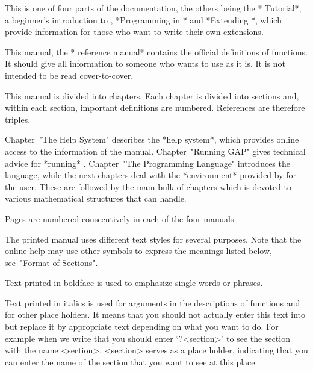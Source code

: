%
%
%
%

This is one of four parts of the {\GAP} documentation,
the others being the *{\GAP} Tutorial*, a beginner's introduction to {\GAP},
*Programming in {\GAP}* and *Extending {\GAP}*,
which provide information for those who want to write their own
{\GAP} extensions.

This manual, the *{\GAP} reference manual* contains the official definitions
of {\GAP} functions. It should give all information to someone who wants to
use {\GAP} as it is. It is not intended to be read cover-to-cover.

This manual is divided into chapters.
Each chapter is divided into sections
and, within each section, important definitions are numbered.
References are therefore triples.

Chapter~"The Help System" describes the *help system*,
which provides online access to the information of the manual.
Chapter~"Running GAP" gives technical advice for *running* {\GAP}.
Chapter~"The Programming Language" introduces the {\GAP} language,
while the next chapters deal with the *environment*
provided by {\GAP} for the user.
These are followed by the main bulk of chapters
which is devoted to various mathematical structures that {\GAP} can handle.

Pages are numbered consecutively in each of the four manuals.


The printed manual uses different text styles for several purposes.
Note that the online help may use other symbols to express the meanings
listed below, see~"Format of Sections".


Text printed in boldface is used to emphasize single words or phrases.


Text printed in italics is used for arguments in the descriptions
of functions and for other place holders. It means that you should not
actually enter this text into {\GAP} but replace it by  appropriate
text depending on what you want to do. For example when we write that
you should enter `?<section>' to see the section with the name <section>,
<section> serves as a place holder, indicating that you can enter the
name of the section that you want to see at this place.


